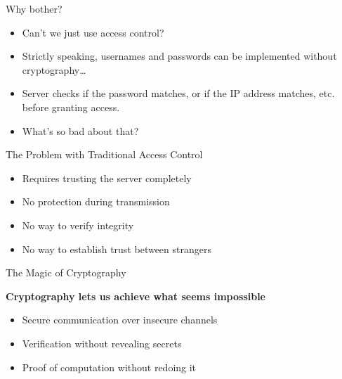 \documentclass[aspectratio=169, lualatex, handout]{beamer}
\begin{document}
	\begin{frame}{Why bother?}
		\begin{itemize}
			\item Can't we just use access control? \pause

			\item Strictly speaking, usernames and passwords can be implemented
				without cryptography\ldots \pause

			\item Server checks if the password matches, or if the IP address matches,
				etc. before granting access. \pause

			\item What's so bad about that?
		\end{itemize}
		\begin{alertblock}{The Problem with Traditional Access Control}
			\begin{itemize}
				\pause

				\item Requires trusting the server completely \pause

				\item No protection during transmission \pause

				\item No way to verify integrity \pause

				\item No way to establish trust between strangers
			\end{itemize}
		\end{alertblock}
	\end{frame}

	\begin{frame}[c]{The Magic of Cryptography}
		\begin{center}
			\Large\textbf{Cryptography lets us achieve what seems impossible}
			\vspace{1cm}
			\begin{itemize}
				\pause

				\item Secure communication over insecure channels \pause

				\item Verification without revealing secrets \pause

				\item Proof of computation without redoing it
			\end{itemize}
		\end{center}
	\end{frame}
\end{document}
